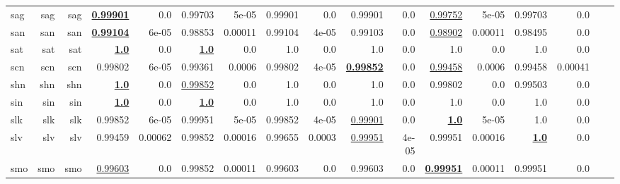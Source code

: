 \documentclass[11pt]{article}
\begin{document}
\begin{table*}[h]
{\begin{tabular}{lrrrrrrrrrrrrrrrr}
sag         & sag         & sag         & \textbf{\underline{0.99901}}         & 0.0         & 0.99703         & 5e-05         & 0.99901         & 0.0         & 0.99901         & 0.0         & \underline{0.99752}         & 5e-05         & 0.99703         & 0.0         \\
san         & san         & san         & \textbf{\underline{0.99104}}         & 6e-05         & 0.98853         & 0.00011         & 0.99104         & 4e-05         & 0.99103         & 0.0         & \underline{0.98902}         & 0.00011         & 0.98495         & 0.0         \\
sat         & sat         & sat         & \textbf{\underline{1.0}}         & 0.0         & \textbf{\underline{1.0}}         & 0.0         & 1.0         & 0.0         & 1.0         & 0.0         & 1.0         & 0.0         & 1.0         & 0.0         \\
scn         & scn         & scn         & 0.99802         & 6e-05         & 0.99361         & 0.0006         & 0.99802         & 4e-05         & \textbf{\underline{0.99852}}         & 0.0         & \underline{0.99458}         & 0.0006         & 0.99458         & 0.00041         \\
shn         & shn         & shn         & \textbf{\underline{1.0}}         & 0.0         & \underline{0.99852}         & 0.0         & 1.0         & 0.0         & 1.0         & 0.0         & 0.99802         & 0.0         & 0.99503         & 0.0         \\
sin         & sin         & sin         & \textbf{\underline{1.0}}         & 0.0         & \textbf{\underline{1.0}}         & 0.0         & 1.0         & 0.0         & 1.0         & 0.0         & 1.0         & 0.0         & 1.0         & 0.0         \\
slk         & slk         & slk         & 0.99852         & 6e-05         & 0.99951         & 5e-05         & 0.99852         & 4e-05         & \underline{0.99901}         & 0.0         & \textbf{\underline{1.0}}         & 5e-05         & 1.0         & 0.0         \\
slv         & slv         & slv         & 0.99459         & 0.00062         & 0.99852         & 0.00016         & 0.99655         & 0.0003         & \underline{0.99951}         & 4e-05         & 0.99951         & 0.00016         & \textbf{\underline{1.0}}         & 0.0         \\
smo         & smo         & smo         & \underline{0.99603}         & 0.0         & 0.99852         & 0.00011         & 0.99603         & 0.0         & 0.99603         & 0.0         & \textbf{\underline{0.99951}}         & 0.00011         & 0.99951         & 0.0         \\

\end{tabular}}
\end{table*}
\end{document}
